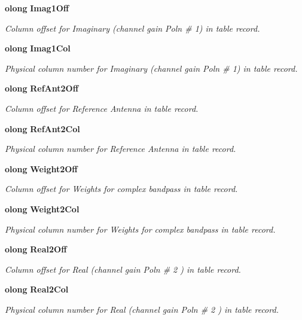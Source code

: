 \begin{CompactItemize}
{\bf olong} {\bf Imag1Off}
\begin{CompactList}\small\item\em Column offset for Imaginary (channel gain Poln \# 1) in table record. \item\end{CompactList}\item 
{\bf olong} {\bf Imag1Col}
\begin{CompactList}\small\item\em Physical column number for Imaginary (channel gain Poln \# 1) in table record. \item\end{CompactList}\item 
{\bf olong} {\bf Ref\-Ant2Off}
\begin{CompactList}\small\item\em Column offset for Reference Antenna in table record. \item\end{CompactList}\item 
{\bf olong} {\bf Ref\-Ant2Col}
\begin{CompactList}\small\item\em Physical column number for Reference Antenna in table record. \item\end{CompactList}\item 
{\bf olong} {\bf Weight2Off}
\begin{CompactList}\small\item\em Column offset for Weights for complex bandpass in table record. \item\end{CompactList}\item 
{\bf olong} {\bf Weight2Col}
\begin{CompactList}\small\item\em Physical column number for Weights for complex bandpass in table record. \item\end{CompactList}\item 
{\bf olong} {\bf Real2Off}
\begin{CompactList}\small\item\em Column offset for Real (channel gain Poln \# 2 ) in table record. \item\end{CompactList}\item 
{\bf olong} {\bf Real2Col}
\begin{CompactList}\small\item\em Physical column number for Real (channel gain Poln \# 2 ) in table record. \item\end{CompactList}\item 

\end{CompactItemize}
